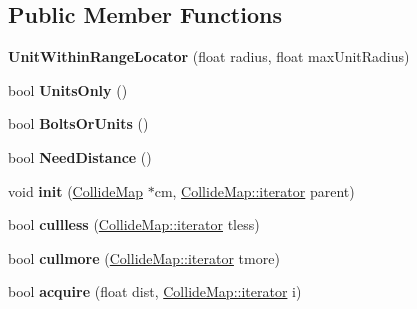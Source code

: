 \subsection*{Public Member Functions}
\begin{DoxyCompactItemize}
\item 
{\bfseries Unit\+Within\+Range\+Locator} (float radius, float max\+Unit\+Radius)\hypertarget{classUnitWithinRangeLocator_aa9422dc409f5ca50632161dc68551b96}{}\label{classUnitWithinRangeLocator_aa9422dc409f5ca50632161dc68551b96}

\item 
bool {\bfseries Units\+Only} ()\hypertarget{classUnitWithinRangeLocator_a09a1a28a6034f5544cc55659ad1fd5c0}{}\label{classUnitWithinRangeLocator_a09a1a28a6034f5544cc55659ad1fd5c0}

\item 
bool {\bfseries Bolts\+Or\+Units} ()\hypertarget{classUnitWithinRangeLocator_a398b44e3a501ee4e73b5e7c3c727ae78}{}\label{classUnitWithinRangeLocator_a398b44e3a501ee4e73b5e7c3c727ae78}

\item 
bool {\bfseries Need\+Distance} ()\hypertarget{classUnitWithinRangeLocator_a1154e972ca50a8988a0ef3f71cdb5e63}{}\label{classUnitWithinRangeLocator_a1154e972ca50a8988a0ef3f71cdb5e63}

\item 
void {\bfseries init} (\hyperlink{classCollideMap}{Collide\+Map} $\ast$cm, \hyperlink{classCollidable}{Collide\+Map\+::iterator} parent)\hypertarget{classUnitWithinRangeLocator_aef73941355325d9d5229c60be9dd184f}{}\label{classUnitWithinRangeLocator_aef73941355325d9d5229c60be9dd184f}

\item 
bool {\bfseries cullless} (\hyperlink{classCollidable}{Collide\+Map\+::iterator} tless)\hypertarget{classUnitWithinRangeLocator_a42b61249fbf1263f020781707a17e7cc}{}\label{classUnitWithinRangeLocator_a42b61249fbf1263f020781707a17e7cc}

\item 
bool {\bfseries cullmore} (\hyperlink{classCollidable}{Collide\+Map\+::iterator} tmore)\hypertarget{classUnitWithinRangeLocator_a8b050e9eed25ff4f74427693915aaac8}{}\label{classUnitWithinRangeLocator_a8b050e9eed25ff4f74427693915aaac8}

\item 
bool {\bfseries acquire} (float dist, \hyperlink{classCollidable}{Collide\+Map\+::iterator} i)\hypertarget{classUnitWithinRangeLocator_a875ebda344ae1ffd48e5891f3ab18902}{}\label{classUnitWithinRangeLocator_a875ebda344ae1ffd48e5891f3ab18902}

\end{DoxyCompactItemize}
